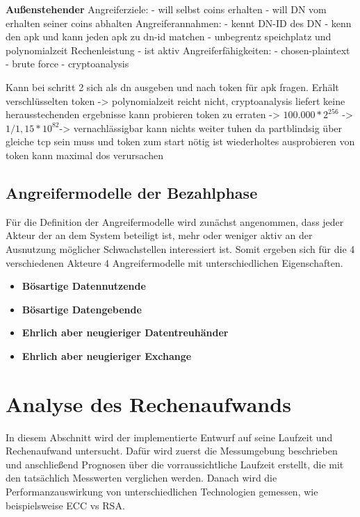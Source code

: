 \documentclass{scrreprt}
\begin{document}
\textbf{Außenstehender}
Angreiferziele:
    - will selbst coins erhalten
    - will DN vom erhalten seiner coins abhalten
Angreiferannahmen:
    - kennt DN-ID des DN
    - kenn den apk und kann jeden apk zu dn-id matchen
    - unbegrentz speichplatz und polynomialzeit Rechenleistung
    - ist aktiv
Angreiferfähigkeiten:
    - chosen-plaintext
    - brute force
    - cryptoanalysis

Kann bei schritt 2 sich als dn ausgeben und nach token für apk fragen.
Erhält verschlüsselten token -> polynomialzeit reicht nicht, cryptoanalysis liefert keine herausstechenden ergebnisse
kann probieren token zu erraten -> $100.000 * 2^256$ -> $1/1,15*10^82 $-> vernachlässigbar
kann nichts weiter tuhen da partblindsig über gleiche tcp sein muss und token zum start nötig ist
wiederholtes ausprobieren von token kann maximal dos verursachen


\subsection{Angreifermodelle der Bezahlphase}
Für die Definition der Angreifermodelle wird zunächst angenommen, dass jeder Akteur der an dem System beteiligt ist, mehr oder weniger aktiv an der Ausnutzung möglicher Schwachstellen interessiert ist. Somit ergeben sich für die 4 verschiedenen Akteure 4 Angreifermodelle mit unterschiedlichen Eigenschaften.
\begin{itemize}
    \item \textbf{Bösartige Datennutzende}
    \item \textbf{Bösartige Datengebende}
    \item \textbf{Ehrlich aber neugieriger Datentreuhänder}
    \item \textbf{Ehrlich aber neugieriger Exchange}
\end{itemize}



\section{Analyse des Rechenaufwands}
In diesem Abschnitt wird der implementierte Entwurf auf seine Laufzeit und Rechenaufwand untersucht. Dafür wird zuerst die Messumgebung beschrieben und anschließend Prognosen über die vorraussichtliche Laufzeit erstellt, die mit den tatsächlich Messwerten verglichen werden. Danach wird die Performanzauswirkung von unterschiedlichen Technologien gemessen, wie beispielsweise ECC vs RSA.
\end{document}
